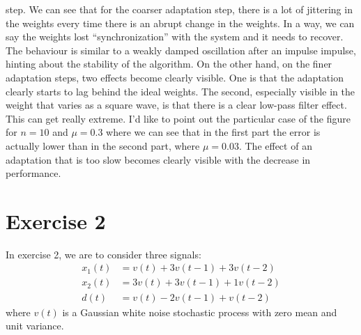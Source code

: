 step. We can see that for the coarser adaptation step, there is a lot of jittering
in the weights every time there is an abrupt change in the weights. In a way, we
can say the weights lost ``synchronization'' with the system and it needs to
recover. The behaviour is similar to a weakly damped oscillation after an impulse
impulse, hinting about the stability of the algorithm. On the other hand, on the
finer adaptation steps, two effects become clearly visible. One is that the
adaptation clearly starts to lag behind the ideal weights. The second, especially
visible in the weight that varies as a square wave, is that there is a clear
low-pass filter effect. This can get really extreme. I'd like to point out the
particular case of the figure~\label{fig:ex1vsig3n10mu3} for \(n=10\) and
\(\mu=0.3\) where we can see that in the first part the error is actually lower
than in the second part, where \(\mu=0.03\). The effect of an adaptation that is
too slow becomes clearly visible with the decrease in performance.

\FloatBarrier
\section{Exercise 2}

In exercise 2, we are to consider three signals:
\begin{align}
    x_1 (t) & = v(t) + 3v(t-1) + 3v(t-2)  \\
    x_2 (t) & = 3v(t) + 3v(t-1) + 1v(t-2) \\
    d(t)    & = v(t) - 2v(t-1) + v(t-2)
\end{align}
where \(v(t)\) is a Gaussian white noise stochastic process with zero mean and
unit variance.

